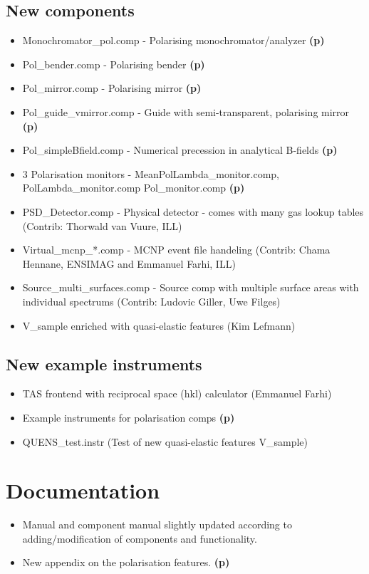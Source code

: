 \subsection{New components}
\begin{itemize}
\item Monochromator\_pol.comp - Polarising monochromator/analyzer {\bf(p)}
\item Pol\_bender.comp - Polarising bender {\bf(p)}
\item Pol\_mirror.comp - Polarising mirror {\bf(p)}
\item Pol\_guide\_vmirror.comp - Guide with semi-transparent, polarising mirror {\bf(p)}
\item Pol\_simpleBfield.comp - Numerical precession in analytical B-fields {\bf(p)}
\item 3 Polarisation monitors - MeanPolLambda\_monitor.comp, PolLambda\_monitor.comp
    Pol\_monitor.comp {\bf(p)}
\item PSD\_Detector.comp - Physical detector - comes with many gas lookup tables 
    (Contrib: Thorwald van Vuure, ILL)
\item Virtual\_mcnp\_*.comp - MCNP event file handeling
    (Contrib: Chama Hennane, ENSIMAG and Emmanuel Farhi, ILL) 
\item Source\_multi\_surfaces.comp - Source comp with multiple surface areas with individual
    spectrums (Contrib: Ludovic Giller, Uwe Filges)
\item V\_sample enriched with quasi-elastic features (Kim Lefmann)
\end{itemize}
\subsection{New example instruments}
\begin{itemize}
\item TAS frontend with reciprocal space (hkl) calculator (Emmanuel Farhi)
\item Example instruments for polarisation comps {\bf(p)}
\item QUENS\_test.instr (Test of new quasi-elastic features V\_sample)
\end{itemize}
\section{Documentation}
\label{s:new-features:documentation}
\begin{itemize}
\item Manual and component manual slightly updated according to
  adding/modification of components and functionality. 
\item New appendix on the polarisation features. {\bf(p)}
\end{itemize}

